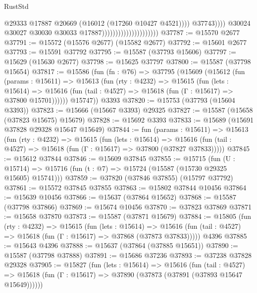 \begin{lexlean}{RustStd}
\begin{coremodule}
                                                          @29333
                                                          @17887
                                                          @20669
                                                          (@16012 (@17260 @10427 @4521))))
                                                      @37743))))
                                              @30024
                                              @30027
                                              @30030
                                              @30033
                                              @17887)))))))))))))))))))))
@37787 := @15570 @2677
@37791 := @15572 (@15576 @2677) (@15582 @2677)
@37792 := @15601 @2677
@37793 := @15591 @37792
@37795 := @15587 (@37793 @15606)
@37797 := @15629 (@15630 @2677)
@37798 := @15625 @37797
@37800 := @15587 (@37798 @15654)
@37817 := @15586
    (fun (fn : @76) =>
    @37795
      (@15609
        (@15612
          (fun (params : @15611) =>
          @15613
            (fun (rty : @4232) =>
            @15615
              (fun (lets : @15614) =>
              @15616 (fun (tail : @4527) => @15618 (fun (Γ : @15617) => @37800 @15701))))))
        @15747))
    @3393
@37820 := @15753 (@37793 (@15604 @3393))
@37823 := @15666 (@15667 @3393) @29325
@37827 := @15587 (@15658 (@37823 @15675) @15679)
@37828 := @15692 @3393
@37833 := @15689 (@15691 @37828 @29328 @15647 @15649)
@37844 := fun (params : @15611) =>
  @15613
    (fun (rty : @4232) =>
    @15615
      (fun (lets : @15614) =>
      @15616 (fun (tail : @4527) => @15618 (fun (Γ : @15617) => @37800 (@37827 @37833)))))
@37845 := @15612 @37844
@37846 := @15609 @37845
@37855 := @15715
    (fun (U : @15714) => @15716 (fun (t : @7) => @15724 (@15587 (@15730 @29325 @15605) @15741)))
@37859 := @37820 (@37846 @37855) (@15797 @37792)
@37861 := @15572 @37845 @37855
@37863 := @15802 @37844 @10456
@37864 := @15639 @10456
@37866 := @15637 (@37864 @15652)
@37868 := @15587 (@37798 @37866)
@37869 := @15674 @10456
@37870 := @37823 @37869
@37871 := @15658 @37870
@37873 := @15587 (@37871 @15679)
@37884 := @15805
    (fun (rty : @4232) =>
    @15615
      (fun (lets : @15614) =>
      @15616 (fun (tail : @4527) => @15618 (fun (Γ : @15617) => @37868 (@37873 @37833)))))
    @4396
@37885 := @15643 @4396
@37888 := @15637 (@37864 (@37885 @15651))
@37890 := @15587 (@37798 @37888)
@37891 := @15686 @37236
@37893 := @37238 @37828 @29328
@37905 := @15827
    (fun (lets : @15614) =>
    @15616
      (fun (tail : @4527) =>
      @15618 (fun (Γ : @15617) => @37890 (@37873 (@37891 (@37893 @15647 @15649))))))

\end{coremodule}
\end{lexlean}
